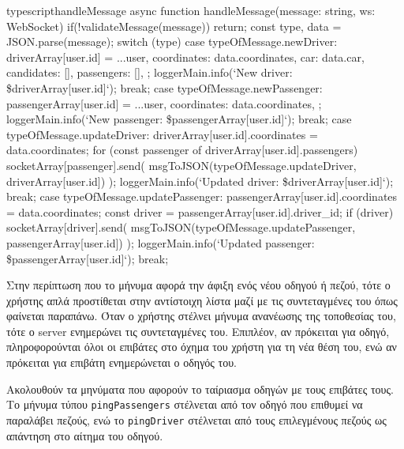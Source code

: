 \documentclass[../thesis.tex]{subfiles}
\begin{document}
\begin{codeblock}{typescript}{handleMessage}
  async function handleMessage(message: string, ws: WebSocket) {
    if(!validateMessage(message)) return;
    const { type, data } = JSON.parse(message);
    switch (type) {
      case typeOfMessage.newDriver: {
        driverArray[user.id] = {
          ...user,
          coordinates: data.coordinates,
          car: data.car,
          candidates: [],
          passengers: [],
        };
        loggerMain.info(`New driver: \${driverArray[user.id]}`);
        break;
      }
      case typeOfMessage.newPassenger: {
        passengerArray[user.id] = {
          ...user,
          coordinates: data.coordinates,
        };
        loggerMain.info(`New passenger: \${passengerArray[user.id]}`);
        break;
      }
    }
    case typeOfMessage.updateDriver: {
      driverArray[user.id].coordinates = data.coordinates;
      for (const passenger of driverArray[user.id].passengers) {
        socketArray[passenger].send(
          msgToJSON(typeOfMessage.updateDriver, driverArray[user.id])
        );
      }
      loggerMain.info(`Updated driver: \${driverArray[user.id]}`);
      break;
    }
    case typeOfMessage.updatePassenger: {
      passengerArray[user.id].coordinates = data.coordinates;
      const driver = passengerArray[user.id].driver_id;
      if (driver) {
        socketArray[driver].send(
          msgToJSON(typeOfMessage.updatePassenger, passengerArray[user.id])
        );
      }
      loggerMain.info(`Updated passenger: \${passengerArray[user.id]}`);
      break;
    }
  }
\end{codeblock}

Στην περίπτωση που το μήνυμα αφορά την άφιξη ενός νέου οδηγού ή πεζού, τότε ο χρήστης απλά προστίθεται στην αντίστοιχη λίστα μαζί με τις συντεταγμένες του όπως φαίνεται παραπάνω.
Όταν ο χρήστης στέλνει μήνυμα ανανέωσης της τοποθεσίας του, τότε ο server ενημερώνει τις συντεταγμένες του. Επιπλέον, αν πρόκειται για οδηγό, πληροφορούνται όλοι οι επιβάτες στο όχημα του χρήστη για τη νέα θέση του, ενώ αν πρόκειται για επιβάτη ενημερώνεται ο οδηγός του.

Ακολουθούν τα μηνύματα που αφορούν το ταίριασμα οδηγών με τους επιβάτες τους.
Το μήνυμα τύπου \texttt{pingPassengers} στέλνεται από τον οδηγό που επιθυμεί να παραλάβει πεζούς, ενώ το \texttt{pingDriver} στέλνεται από τους επιλεγμένους πεζούς ως απάντηση στο αίτημα του οδηγού.
\end{document}
